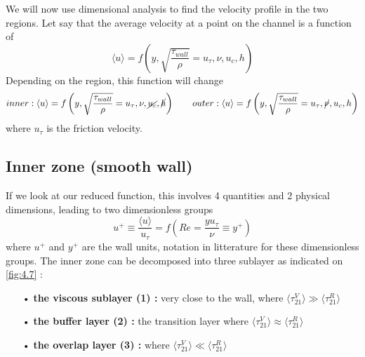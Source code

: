 		We will now use dimensional analysis to find the velocity profile in the two regions. Let say that the average velocity at a point on the channel is a function of 
		\begin{equation}
			\langle u \rangle = f\left(y, \sqrt{\frac{\tau _{wall}}{\rho}} = u_{\tau}, \nu , u_c , h\right)
		\end{equation}
		Depending on the region, this function will change 
		\begin{equation}
			inner :  \langle u \rangle = f\left(y, \sqrt{\frac{\tau _{wall}}{\rho}} = u_{\tau}, \nu, \cancel{u_c}, \cancel{h}\right) \qquad outer : \langle u \rangle = f\left(y, \sqrt{\frac{\tau _{wall}}{\rho}} = u_{\tau}, \cancel{\nu}, u_c , h\right)
		\end{equation}
		where $u_\tau$ is the friction velocity. 

	\subsection{Inner zone (smooth wall)}
		If we look at our reduced function, this involves 4 quantities and 2 physical dimensions, leading to two dimensionless groups 
		\begin{equation}
			u^+ \equiv \frac{\langle u \rangle}{u_\tau} = f\left(Re = \frac{y u_\tau }{\nu}\equiv y^+\right)
		\end{equation}		 
		where $u^+$ and $y^+$ are the wall units, notation in litterature for these dimensionless groups. The inner zone can be decomposed into three sublayer as indicated on \autoref{fig:4.7} :\\
		\begin{itemize}
			\item[•] \textbf{the viscous sublayer (1) :} very close to the wall, where $\langle \tau _{21} ^V \rangle \gg \langle \tau _{21} ^R \rangle $
			\item[•] \textbf{the buffer layer (2) :} the transition layer where $\langle \tau _{21} ^V \rangle \approx \langle \tau _{21} ^R \rangle $ 
			\item[•] \textbf{the overlap layer (3) :} where $\langle \tau _{21} ^V \rangle \ll \langle \tau _{21} ^R \rangle $
		\end{itemize}
		

